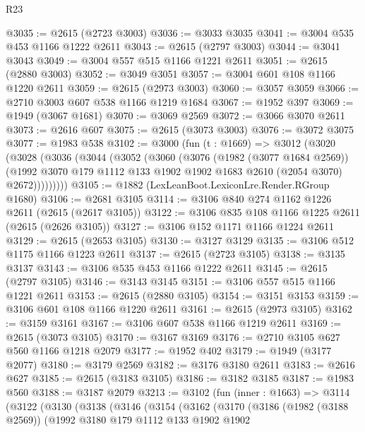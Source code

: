 \begin{lexlean}{R23}
\begin{coremodule}
@3035 := @2615 (@2723 @3003)
@3036 := @3033 @3035
@3041 := @3004 @535 @453 @1166 @1222 @2611
@3043 := @2615 (@2797 @3003)
@3044 := @3041 @3043
@3049 := @3004 @557 @515 @1166 @1221 @2611
@3051 := @2615 (@2880 @3003)
@3052 := @3049 @3051
@3057 := @3004 @601 @108 @1166 @1220 @2611
@3059 := @2615 (@2973 @3003)
@3060 := @3057 @3059
@3066 := @2710 @3003 @607 @538 @1166 @1219 @1684
@3067 := @1952 @397
@3069 := @1949 (@3067 @1681)
@3070 := @3069 @2569
@3072 := @3066 @3070 @2611
@3073 := @2616 @607
@3075 := @2615 (@3073 @3003)
@3076 := @3072 @3075
@3077 := @1983 @538
@3102 := @3000
    (fun (t : @1669) =>
    @3012
      (@3020
        (@3028
          (@3036
            (@3044
              (@3052
                (@3060
                  (@3076
                    (@1982 (@3077 @1684 @2569))
                    (@1992
                      @3070
                      @179
                      @1112
                      @133
                      @1902
                      @1902
                      @1683
                      @2610
                      (@2054 @3070)
                      @2672)))))))))
@3105 := @1882 (LexLeanBoot.LexiconLre.Render.RGroup @1680)
@3106 := @2681 @3105
@3114 := @3106 @840 @274 @1162 @1226 @2611 (@2615 (@2617 @3105))
@3122 := @3106 @835 @108 @1166 @1225 @2611 (@2615 (@2626 @3105))
@3127 := @3106 @152 @1171 @1166 @1224 @2611
@3129 := @2615 (@2653 @3105)
@3130 := @3127 @3129
@3135 := @3106 @512 @1175 @1166 @1223 @2611
@3137 := @2615 (@2723 @3105)
@3138 := @3135 @3137
@3143 := @3106 @535 @453 @1166 @1222 @2611
@3145 := @2615 (@2797 @3105)
@3146 := @3143 @3145
@3151 := @3106 @557 @515 @1166 @1221 @2611
@3153 := @2615 (@2880 @3105)
@3154 := @3151 @3153
@3159 := @3106 @601 @108 @1166 @1220 @2611
@3161 := @2615 (@2973 @3105)
@3162 := @3159 @3161
@3167 := @3106 @607 @538 @1166 @1219 @2611
@3169 := @2615 (@3073 @3105)
@3170 := @3167 @3169
@3176 := @2710 @3105 @627 @560 @1166 @1218 @2079
@3177 := @1952 @402
@3179 := @1949 (@3177 @2077)
@3180 := @3179 @2569
@3182 := @3176 @3180 @2611
@3183 := @2616 @627
@3185 := @2615 (@3183 @3105)
@3186 := @3182 @3185
@3187 := @1983 @560
@3188 := @3187 @2079
@3213 := @3102
    (fun (inner : @1663) =>
    @3114
      (@3122
        (@3130
          (@3138
            (@3146
              (@3154
                (@3162
                  (@3170
                    (@3186
                      (@1982 (@3188 @2569))
                      (@1992
                        @3180
                        @179
                        @1112
                        @133
                        @1902
                        @1902

\end{coremodule}
\end{lexlean}
